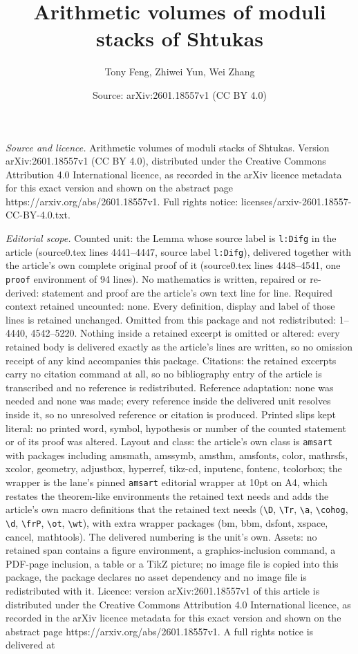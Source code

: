 \documentclass[10pt,a4paper]{amsart}
\title[Arithmetic volumes of moduli stacks of Shtukas]{Arithmetic volumes of moduli stacks of Shtukas}
\author{Tony Feng, Zhiwei Yun, Wei Zhang}
\date{Source: arXiv:2601.18557v1 (CC BY 4.0)}
\begin{document}
\maketitle

\noindent\emph{Source and licence.} Arithmetic volumes of moduli stacks of Shtukas. Version arXiv:2601.18557v1 (CC BY 4.0), distributed under the Creative Commons Attribution 4.0 International licence, as recorded in the arXiv licence metadata for this exact version and shown on the abstract page https://arxiv.org/abs/2601.18557v1. Full rights notice: licenses/arxiv-2601.18557-CC-BY-4.0.txt.\par\smallskip

\noindent\textit{Editorial scope.} Counted unit: the Lemma whose source label is \texttt{l:Difg} in the article (source0.tex lines 4441--4447, source label \texttt{l:Difg}), delivered together with the article's own complete original proof of it (source0.tex lines 4448--4541, one \texttt{proof} environment of 94 lines). No mathematics is written, repaired or re-derived: statement and proof are the article's own text line for line. Required context retained uncounted: none. Every definition, display and label of those lines is retained unchanged. Omitted from this package and not redistributed: 1--4440, 4542--5220. Nothing inside a retained excerpt is omitted or altered: every retained body is delivered exactly as the article's lines are written, so no omission receipt of any kind accompanies this package. Citations: the retained excerpts carry no citation command at all, so no bibliography entry of the article is transcribed and no reference is redistributed. Reference adaptation: none was needed and none was made; every reference inside the delivered unit resolves inside it, so no unresolved reference or citation is produced. Printed slips kept literal: no printed word, symbol, hypothesis or number of the counted statement or of its proof was altered. Layout and class: the article's own class is \texttt{amsart} with packages including amsmath, amssymb, amsthm, amsfonts, color, mathrsfs, xcolor, geometry, adjustbox, hyperref, tikz-cd, inputenc, fontenc, tcolorbox; the wrapper is the lane's pinned \texttt{amsart} editorial wrapper at 10pt on A4, which restates the theorem-like environments the retained text needs and adds the article's own macro definitions that the retained text needs (\texttt{\textbackslash D}, \texttt{\textbackslash Tr}, \texttt{\textbackslash a}, \texttt{\textbackslash cohog}, \texttt{\textbackslash d}, \texttt{\textbackslash frP}, \texttt{\textbackslash ot}, \texttt{\textbackslash wt}), with extra wrapper packages (bm, bbm, dsfont, xspace, cancel, mathtools). The delivered numbering is the unit's own. Assets: no retained span contains a figure environment, a graphics-inclusion command, a PDF-page inclusion, a table or a TikZ picture; no image file is copied into this package, the package declares no asset dependency and no image file is redistributed with it. Licence: version arXiv:2601.18557v1 of this article is distributed under the Creative Commons Attribution 4.0 International licence, as recorded in the arXiv licence metadata for this exact version and shown on the abstract page https://arxiv.org/abs/2601.18557v1. A full rights notice is delivered at 
\end{document}

